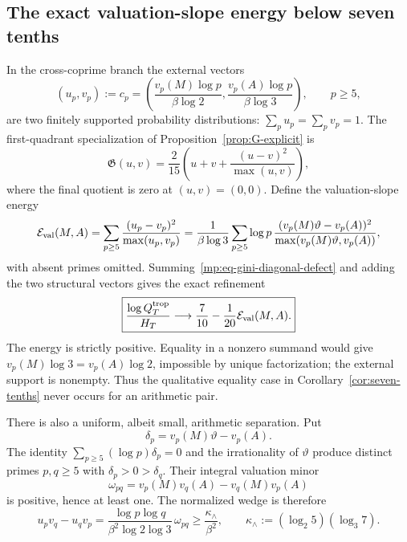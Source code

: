 \documentclass[11pt,oneside]{article}
\theoremstyle{definition}
\theoremstyle{remark}
\begin{document}
\subsection{The exact valuation-slope energy below seven tenths}
\label{mp:valuation-slope-energy}

In the cross-coprime branch the external vectors
\[
 (u_p,v_p):=c_p
 =\left(\frac{v_p(M)\log p}{\beta\log2},
         \frac{v_p(A)\log p}{\beta\log3}\right),\qquad p\ge5,
\]
are two finitely supported probability distributions:
$\sum_pu_p=\sum_pv_p=1$.  The first-quadrant specialization of
Proposition~\ref{prop:G-explicit} is
\begin{equation}
 \mathfrak G(u,v)=\frac2{15}\left(
 u+v+\frac{(u-v)^2}{\max(u,v)}\right),
 \label{mp:eq-gini-diagonal-defect}
\end{equation}
where the final quotient is zero at $(u,v)=(0,0)$.  Define the valuation-slope energy
\begin{equation}
 \mathcal E_{\rm val}(M,A)
 =\sum_{p\ge5}\frac{(u_p-v_p)^2}{\max(u_p,v_p)}
 =\frac1{\beta\log3}\sum_{p\ge5}\log p\,
   \frac{(v_p(M)\vartheta-v_p(A))^2}
        {\max(v_p(M)\vartheta,v_p(A))},
 \label{mp:eq-valuation-slope-energy}
\end{equation}
with absent primes omitted.  Summing~\eqref{mp:eq-gini-diagonal-defect} and adding the two
structural vectors gives the exact refinement
\begin{equation}
 \boxed{
 \frac{\log Q_T^{\mathrm{trop}}}{H_T}
 \longrightarrow\frac7{10}-\frac1{20}\mathcal E_{\rm val}(M,A).}
 \label{mp:eq-energy-corrected-ceiling}
\end{equation}
The energy is strictly positive.  Equality in a nonzero summand would give
$v_p(M)\log3=v_p(A)\log2$, impossible by unique factorization; the external support is
nonempty.  Thus the qualitative equality case in Corollary~\ref{cor:seven-tenths} never
occurs for an arithmetic pair.

There is also a uniform, albeit small, arithmetic separation.  Put
\[
 \delta_p=v_p(M)\vartheta-v_p(A).
\]
The identity $\sum_{p\ge5}(\log p)\delta_p=0$ and the irrationality of $\vartheta$ produce
distinct primes $p,q\ge5$ with $\delta_p>0>\delta_q$.  Their integral valuation minor
\begin{equation}
 \omega_{pq}=v_p(M)v_q(A)-v_q(M)v_p(A)
 \label{mp:eq-straddling-minor}
\end{equation}
is positive, hence at least one.  The normalized wedge is therefore
\begin{equation}
 u_pv_q-u_qv_p
 =\frac{\log p\log q}{\beta^2\log2\log3}\,\omega_{pq}
 \ge\frac{\kappa_{\wedge}}{\beta^2},\qquad
 \kappa_{\wedge}:=(\log_2 5)(\log_3 7).
 \label{mp:eq-normalized-straddling-wedge}
\end{equation}
\end{document}
